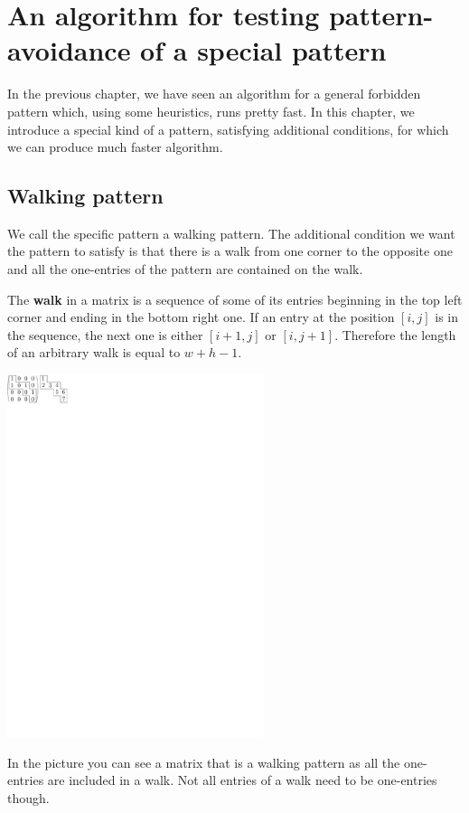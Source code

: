 \chapter{An algorithm for testing pattern-avoidance of a special pattern}
In the previous chapter, we have seen an algorithm for a general forbidden pattern which, using some heuristics, runs pretty fast. In this chapter, we introduce a special kind of a pattern, satisfying additional conditions, for which we can produce much faster algorithm.

\section{Walking pattern}
We call the specific pattern a walking pattern. The additional condition we want the pattern to satisfy is that there is a walk from one corner to the opposite one and all the one-entries of the pattern are contained on the walk.

The \textbf{walk} in a matrix is a sequence of some of its entries beginning in the top left corner and ending in the bottom right one. If an entry at the position $[i,j]$ is in the sequence, the next one is either $[i+1,j]$ or $[i,j+1]$. Therefore the length of an arbitrary walk is equal to $w+h-1$.

\centerline{\mbox{\includegraphics[width=75mm]{../img/walk.pdf}}}

In the picture you can see a matrix that is a walking pattern as all the one-entries are included in a walk. Not all entries of a walk need to be one-entries though.

